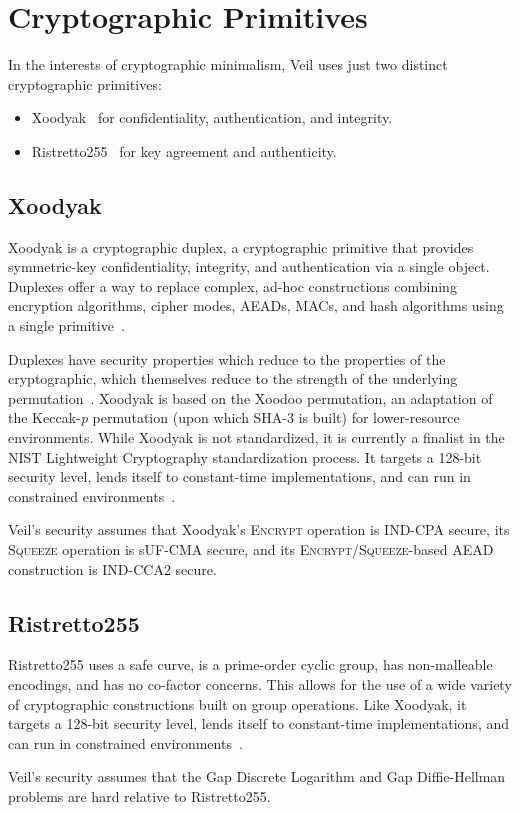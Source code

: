 \section{Cryptographic Primitives}\label{sec:cryptographic-primitives}

In the interests of cryptographic minimalism, Veil uses just two distinct cryptographic primitives:

\begin{itemize}
    \item Xoodyak~\cite{daemen2020} for confidentiality, authentication, and integrity.
    \item Ristretto255~\cite{deValence2020} for key agreement and authenticity.
\end{itemize}

\subsection{Xoodyak}\label{subsec:xoodyak}

Xoodyak is a cryptographic duplex, a cryptographic primitive that provides symmetric-key confidentiality,
integrity, and authentication via a single object.
Duplexes offer a way to replace complex, ad-hoc constructions combining encryption algorithms, cipher modes,
AEADs, MACs, and hash algorithms using a single primitive~\cite{daemen2020, bertoni2011duplex}.

Duplexes have security properties which reduce to the properties of the cryptographic, which themselves reduce to the
strength of the underlying permutation~\cite{bertoni2008}.
Xoodyak is based on the Xoodoo permutation, an adaptation of the
Keccak-\emph{p} permutation (upon which SHA-3 is built) for lower-resource environments.
While Xoodyak is not standardized, it is currently a finalist in the NIST Lightweight Cryptography
standardization process.
It targets a 128-bit security level, lends itself to constant-time implementations, and can run in constrained
environments~\cite{daemen2020}.

Veil's security assumes that Xoodyak's \textsc{Encrypt} operation is IND-CPA secure, its
\textsc{Squeeze} operation is sUF-CMA secure, and its
\textsc{Encrypt}/\textsc{Squeeze}-based AEAD construction is IND-CCA2 secure.

\subsection{Ristretto255}\label{subsec:ristretto255}

Ristretto255 uses a safe curve, is a prime-order cyclic group, has non-malleable encodings, and has no
co-factor concerns.
This allows for the use of a wide variety of cryptographic constructions built on group operations.
Like Xoodyak, it targets a 128-bit security level, lends itself to constant-time implementations, and can
run in constrained environments~\cite{deValence2018}.

Veil's security assumes that the Gap Discrete Logarithm and Gap Diffie-Hellman problems are hard relative to
Ristretto255.
